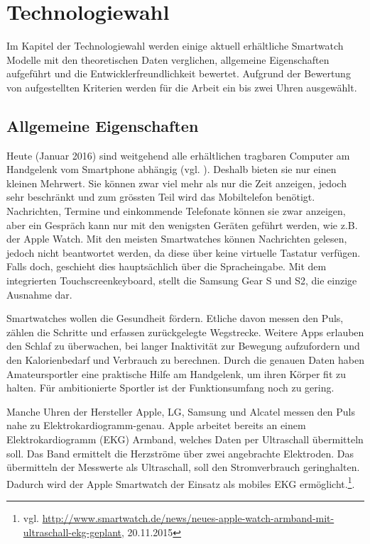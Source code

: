 \chapter{Technologiewahl}
Im Kapitel der Technologiewahl werden einige aktuell erhältliche Smartwatch Modelle mit den theoretischen Daten verglichen, allgemeine Eigenschaften aufgeführt und die Entwicklerfreundlichkeit bewertet. Aufgrund der Bewertung von aufgestellten Kriterien werden für die Arbeit ein bis zwei Uhren ausgewählt.

\section{Allgemeine Eigenschaften}
Heute (Januar 2016) sind weitgehend alle erhältlichen tragbaren Computer am Handgelenk vom Smartphone abhängig (vgl. \cite{stwt:sw}). Deshalb bieten sie nur einen kleinen Mehrwert. Sie können zwar viel mehr als nur die Zeit anzeigen, jedoch sehr beschränkt und zum grössten Teil wird das Mobiltelefon benötigt. Nachrichten, Termine und einkommende Telefonate können sie zwar anzeigen, aber ein Gespräch kann nur mit den wenigsten Geräten geführt werden, wie z.B. der Apple Watch. Mit den meisten Smartwatches können Nachrichten gelesen, jedoch nicht beantwortet werden, da diese über keine virtuelle Tastatur verfügen. Falls doch, geschieht dies hauptsächlich über die Spracheingabe. Mit dem integrierten Touchscreenkeyboard, stellt die Samsung Gear S und S2, die einzige Ausnahme dar.

Smartwatches wollen die Gesundheit fördern. Etliche davon messen den Puls, zählen die Schritte und erfassen zurückgelegte Wegstrecke. Weitere Apps erlauben den Schlaf zu überwachen, bei langer Inaktivität zur Bewegung aufzufordern und den Kalorienbedarf und Verbrauch zu berechnen. Durch die genauen Daten haben Amateursportler eine praktische Hilfe am Handgelenk, um ihren Körper fit zu halten. Für ambitionierte Sportler ist der Funktionsumfang noch zu gering.

Manche Uhren der Hersteller Apple, LG, Samsung und Alcatel messen den Puls nahe zu Elektrokardiogramm-genau. Apple arbeitet bereits an einem Elektrokardiogramm (EKG) Armband, welches Daten per Ultraschall übermitteln soll. Das Band ermittelt die Herzströme über zwei angebrachte Elektroden. Das übermitteln der Messwerte als Ultraschall, soll den Stromverbrauch geringhalten. Dadurch wird der Apple Smartwatch der Einsatz als mobiles EKG ermöglicht.\footnote{vgl. \url{http://www.smartwatch.de/news/neues-apple-watch-armband-mit-ultraschall-ekg-geplant}, 20.11.2015}.

